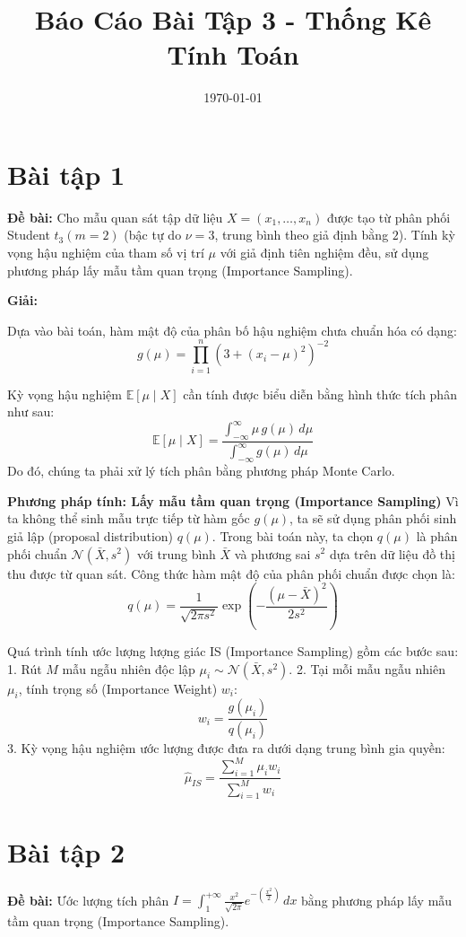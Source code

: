 \documentclass[12pt,a4paper]{article}
\title{\textbf{Báo Cáo Bài Tập 3 - Thống Kê Tính Toán}}
\author{}
\date{\today}
\begin{document}
\maketitle

\section*{Bài tập 1}
\textbf{Đề bài:} Cho mẫu quan sát tập dữ liệu $X = (x_1, \dots, x_n)$ được tạo từ phân phối Student $t_3(m=2)$ (bậc tự do $\nu = 3$, trung bình theo giả định bằng $2$). Tính kỳ vọng hậu nghiệm của tham số vị trí $\mu$ với giả định tiên nghiệm đều, sử dụng phương pháp lấy mẫu tầm quan trọng (Importance Sampling).

\textbf{Giải:}

Dựa vào bài toán, hàm mật độ của phân bố hậu nghiệm chưa chuẩn hóa có dạng:
$$ g(\mu) = \prod_{i=1}^n (3 + (x_i - \mu)^2)^{-2} $$

Kỳ vọng hậu nghiệm $\mathbb{E}[\mu \mid X]$ cần tính được biểu diễn bằng hình thức tích phân như sau:
$$ \mathbb{E}[\mu \mid X] = \frac{\int_{-\infty}^{\infty} \mu \, g(\mu) \, d\mu}{\int_{-\infty}^{\infty} g(\mu) \, d\mu} $$
Do đó, chúng ta phải xử lý tích phân bằng phương pháp Monte Carlo.

\textbf{Phương pháp tính: Lấy mẫu tầm quan trọng (Importance Sampling)}
Vì ta không thể sinh mẫu trực tiếp từ hàm gốc $g(\mu)$, ta sẽ sử dụng phân phối sinh giả lập (proposal distribution) $q(\mu)$. 
Trong bài toán này, ta chọn $q(\mu)$ là phân phối chuẩn $\mathcal{N}(\bar{X}, s^2)$ với trung bình $\bar{X}$ và phương sai $s^2$ dựa trên dữ liệu đồ thị thu được từ quan sát.
Công thức hàm mật độ của phân phối chuẩn được chọn là:
$$ q(\mu) = \frac{1}{\sqrt{2\pi s^2}} \exp \left( -\frac{(\mu - \bar{X})^2}{2s^2} \right) $$

Quá trình tính ước lượng lượng giác IS (Importance Sampling) gồm các bước sau:
1. Rút $M$ mẫu ngẫu nhiên độc lập $\mu_i \sim \mathcal{N}(\bar{X}, s^2)$.
2. Tại mỗi mẫu ngẫu nhiên $\mu_i$, tính trọng số (Importance Weight) $w_i$:
$$ w_i = \frac{g(\mu_i)}{q(\mu_i)} $$
3. Kỳ vọng hậu nghiệm ước lượng được đưa ra dưới dạng trung bình gia quyền:
$$ \hat{\mu}_{IS} = \frac{\sum_{i=1}^{M} \mu_i w_i}{\sum_{i=1}^{M} w_i} $$

\section*{Bài tập 2}
\textbf{Đề bài:} Ước lượng tích phân $I = \int_{1}^{+\infty} \frac{x^2}{\sqrt{2\pi}} e^{-\left(\frac{x^2}{2}\right)} \, dx$ bằng phương pháp lấy mẫu tầm quan trọng (Importance Sampling).
\end{document}
